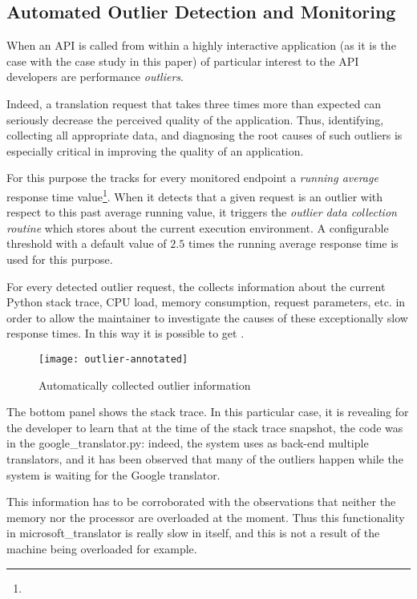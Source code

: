   \subsection{Automated Outlier Detection and Monitoring}
  
  When an API is called from within a highly interactive application (as it is the case with the case study in this paper) 
  of particular interest to the API developers are performance {\em outliers}. 

  Indeed, a translation request that takes three times more than expected can seriously decrease the perceived quality of the application. Thus, identifying, collecting all appropriate data, and diagnosing the root causes of such outliers is especially critical in improving the quality of an application. 
  
  
  For this purpose the \tool tracks for every monitored endpoint a {\em running average} response time value\footnote{}. When it detects that a given request is an outlier with respect to this past average running value, it triggers the {\em outlier data collection routine} which stores  about the current execution environment. A configurable threshold with a default value of $2.5$ times the running average response time is used for this purpose. 

  For every detected outlier request, the \tool collects information about the current Python stack trace, CPU load, memory consumption, request parameters, etc. in order to allow the maintainer to investigate the causes of these exceptionally slow response times. In this way it is possible to get .


  \begin{figure}[h!]
    \centering
    \texttt{[image: outlier-annotated]}
    \caption{Automatically collected outlier information}
    \label{fig:figure1}
  \end{figure}
  

The bottom panel shows the stack trace. 
In this particular case, it is revealing for the developer to learn that at the time of the stack trace snapshot, the code was in the google\_translator.py: indeed, the system uses as back-end multiple translators, and it has been observed that many of the outliers happen while the system is waiting for the Google translator.

This information has to be corroborated with the observations that neither the memory nor the processor are overloaded at the moment. Thus this functionality in microsoft\_translator is really slow in itself, and this is not a result of the machine being overloaded for example. 









